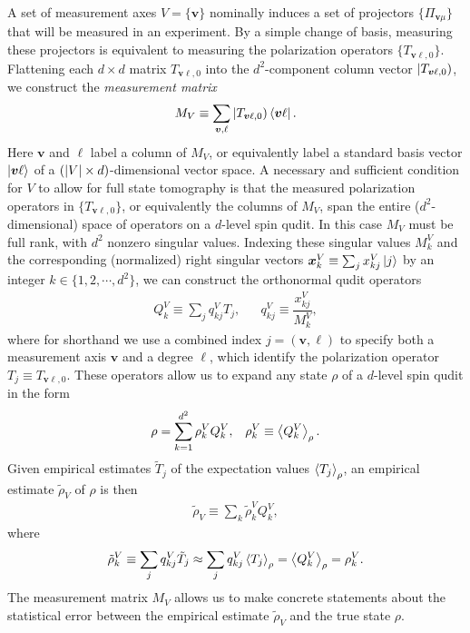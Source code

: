 \documentclass[notitlepage,twocolumn]{revtex4-2}
\newcommand{\f}[2]{\dfrac{#1}{#2}} %
\newcommand{\p}[1]{\left(#1\right)} %
\newcommand{\bk}{\Braket} %
\renewcommand{\v}{\bm} %
\renewcommand{\set}[1]{\{#1\}} %
\def\oket#1{\mathinner{|{#1})}}
\begin{document}
A set of measurement axes $V=\set{\v v}$ nominally induces a set of projectors $\set{\Pi_{\v v\mu}}$ that will be measured in an experiment.
By a simple change of basis, measuring these projectors is equivalent to measuring the polarization operators $\set{T_{\v v\ell,0}}$.
Flattening each $d\times d$ matrix $T_{\v v\ell,0}$ into the $d^2$-component column vector $\oket{T_{\v v\ell,0}}$, we construct the {\it measurement matrix}
\begin{align}
  M_V \equiv \sum_{\v v,\ell} \oket{T_{\v v\ell,0}} \bra{\v v\ell}.
  \label{eq:meas_mat}
\end{align}
Here $\v v$ and $\ell$ label a column of $M_V$, or equivalently label a standard basis vector $\ket{\v v\ell}$ of a $\p{\abs{V}\times d}$-dimensional vector space.
A necessary and sufficient condition for $V$ to allow for full state tomography is that the measured polarization operators in $\set{T_{\v v\ell,0}}$, or equivalently the columns of $M_V$, span the entire ($d^2$-dimensional) space of operators on a $d$-level spin qudit.
In this case $M_V$ must be full rank, with $d^2$ nonzero singular values.
Indexing these singular values $M^V_k$ and the corresponding (normalized) right singular vectors $\v x^V_k\equiv \sum_j x^V_{kj} \ket{j}$ by an integer $k\in\set{1,2,\cdots,d^2}$, we can construct the orthonormal qudit operators
\begin{align}
  Q^V_k \equiv \sum_j q^V_{kj} T_j,
  &&
  q^V_{kj} \equiv \f{x^V_{kj}}{M^V_k},
\end{align}
where for shorthand we use a combined index $j=\p{\v v,\ell}$ to specify both a measurement axis $\v v$ and a degree $\ell$, which identify the polarization operator $T_j\equiv T_{\v v\ell,0}$.
These operators allow us to expand any state $\rho$ of a $d$-level spin qudit in the form
\begin{align}
  \rho = \sum_{k=1}^{d^2} \rho_k^V Q_k^V,
  &&
  \rho_k^V \equiv \bk{Q^V_k}_\rho.
\end{align}
Given empirical estimates $\tilde T_j$ of the expectation values $\bk{T_j}_\rho$, an empirical estimate $\tilde\rho_V$ of $\rho$ is then
\begin{align}
  \tilde\rho_V \equiv \sum_k \tilde\rho^V_k Q^V_k,
  \label{eq:reconstructed_state}
\end{align}
where
\begin{align}
  \tilde\rho^V_k \equiv \sum_j q^V_{kj} \tilde T_j
  \approx \sum_j q^V_{kj} \bk{T_j}_\rho
  = \bk{Q^V_k}_\rho
  = \rho^V_k.
\end{align}
The measurement matrix $M_V$ allows us to make concrete statements about the statistical error between the empirical estimate $\tilde\rho_V$ and the true state $\rho$.
\end{document}
